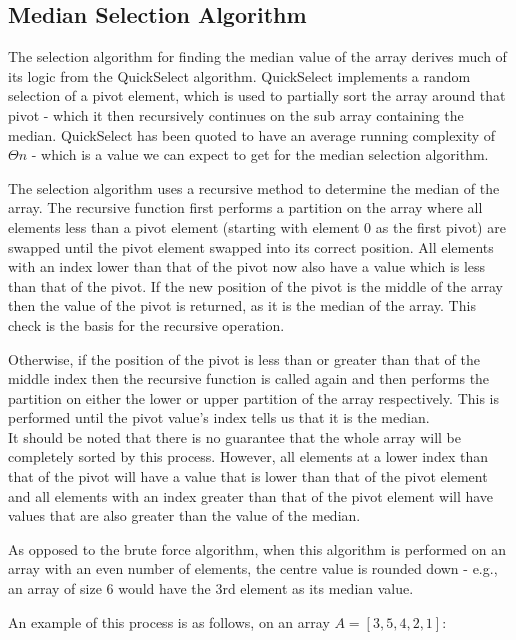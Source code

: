 \documentclass{article}
\begin{document}
    \subsection{Median Selection Algorithm}
        The selection algorithm for finding the median value of the array derives much of its logic from the QuickSelect algorithm. QuickSelect implements a random selection of a pivot element, which is used to partially sort the array around that pivot - which it then recursively continues on the sub array containing the median. QuickSelect has been quoted to have an average running complexity of $\Theta{n}$ \cite{cormen} - which is a value we can expect to get for the median selection algorithm.

        The selection algorithm uses a recursive method to determine the median of the array.  The recursive function first performs a partition on the array where all elements less than a pivot element (starting with element 0 as the first pivot) are swapped until the pivot element swapped into its correct position. All elements with an index lower than that of the pivot now also have a value which is less than that of the pivot. If the new position of the pivot is the middle of the array then the value of the pivot is returned, as it is the median of the array. This check is the basis for the recursive operation.

        Otherwise, if the position of the pivot is less than or greater than that of the middle index then the recursive function is called again and then performs the partition on either the lower or upper partition of the array respectively. This is performed until the pivot value's index tells us that it is the median.\\
        It should be noted that there is no guarantee that the whole array will be completely sorted by this process. However, all elements at a lower index than that of the pivot will have a value that is lower than that of the pivot element and all elements with an index greater than that of the pivot element will have values that are also greater than the value of the median.

        As opposed to the brute force algorithm, when this algorithm is performed on an array with an even number of elements, the centre value is rounded down - e.g., an array of size 6 would have the 3rd element as its median value.

        An example of this process is as follows, on an array $A = [3, 5, 4, 2, 1]$:\\
\end{document}
